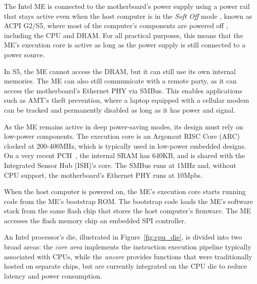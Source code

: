 
The Intel ME is connected to the motherboard's power supply using a power rail
that stays active even when the host computer is in the \textit{Soft Off} mode
\cite{intel2015chipset}, known as ACPI G2/S5, where most of the computer's
components are powered off \cite{intel2010power}, including the CPU and DRAM.
For all practical purposes, this means that the ME's execution core is active
as long as the power supply is still connected to a power source.

In S5, the ME cannot access the DRAM, but it can still use its own internal
memories. The ME can also still communicate with a remote party, as it can
access the motherboard's Ethernet PHY via SMBus. This enables applications such
as AMT's theft prevention, where a laptop equipped with a cellular modem can be
tracked and permanently disabled as long as it has power and signal.

As the ME remains active in deep power-saving modes, its design must rely on
low-power components. The execution core is an Argonaut RISC Core (ARC) clocked
at 200-400MHz, which is typically used in low-power embedded designs. On a very
recent PCH~\cite{intel2015chipset}, the internal SRAM has 640KB, and is shared
with the Integrated Sensor Hub (ISH)'s core. The SMBus runs at 1MHz and,
without CPU support, the motherboard's Ethernet PHY runs at 10Mpbs.

When the host computer is powered on, the ME's execution core starts running
code from the ME's bootstrap ROM. The bootstrap code loads the ME's software
stack from the same flash chip that stores the host computer's firmware. The
ME accesses the flash memory chip an embedded SPI controller.


\label{sec:cpu_die}

An Intel processor's die, illustrated in Figure~\ref{fig:cpu_die}, is divided
into two broad areas: the \textit{core area} implements the instruction
execution pipeline typically associated with CPUs, while the \textit{uncore}
provides functions that were traditionally hosted on separate chips, but are
currently integrated on the CPU die to reduce latency and power consumption.

